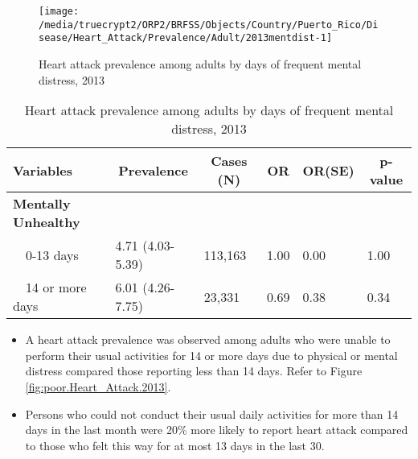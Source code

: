 \begin{figure}[H]
\centering
\caption{Heart attack prevalence among adults by days of frequent mental distress, 2013}
\label{fig:mental.Heart_Attack.2013}

\begin{knitrout}
\color{fgcolor}

{\centering \texttt{[image: /media/truecrypt2/ORP2/BRFSS/Objects/Country/Puerto\_Rico/Disease/Heart\_Attack/Prevalence/Adult/2013mentdist-1]} 

}



\end{knitrout}
 \end{figure}

\begin{table}[H]
\caption{Heart attack prevalence among adults by days of frequent mental distress, 2013\label{tab:mental.Heart_Attack.2013}} 
\begin{center}
\begin{tabular}{llllll}
\hline\hline
\multicolumn{1}{l}{Variables}&\multicolumn{1}{c}{Prevalence}&\multicolumn{1}{c}{Cases (N)}&\multicolumn{1}{c}{OR}&\multicolumn{1}{c}{OR(SE)}&\multicolumn{1}{c}{p-value}\tabularnewline
\hline
{\bfseries Mentally Unhealthy}&&&&&\tabularnewline
~~0-13 days&4.71 (4.03-5.39)&113,163&1.00&0.00&1.00\tabularnewline
~~14 or more days&6.01 (4.26-7.75)& 23,331&0.69&0.38&0.34\tabularnewline
\hline
\end{tabular}\end{center}

\end{table}



 \newpage
\begin{itemize}

\item A  
heart attack prevalence was observed among adults who were unable to perform their usual activities for 14  or more days due to physical or mental distress compared those reporting less than 14 days. Refer to Figure \ref{fig:poor.Heart_Attack.2013}.


\item Persons who could not conduct their usual daily activities for more than 14 days in the last month were 20\% more likely to report heart attack compared to those who felt this way for at most 13 days in the last 30.

\end{itemize}

